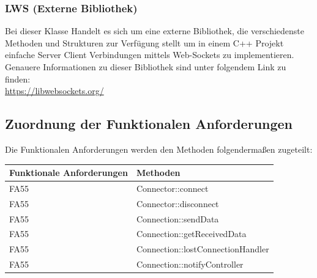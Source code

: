     \subsubsection{LWS (Externe Bibliothek)}
		Bei dieser Klasse Handelt es sich um eine externe Bibliothek, die verschiedenste Methoden und Strukturen zur Verfügung stellt um in einem C++ Projekt einfache Server Client Verbindungen mittels Web-Sockets zu implementieren. Genauere Informationen zu dieser Bibliothek sind unter folgendem Link zu finden: \\ \url{https://libwebsockets.org/}

\subsection{Zuordnung der Funktionalen Anforderungen}

Die Funktionalen Anforderungen werden den Methoden folgendermaßen zugeteilt:

\begin{table}[h]
	\centering
	\begin{tabular}{|l|l|}
    	\hline
    	\textbf{Funktionale Anforderungen} & \textbf{Methoden} \\ \hline
		FA55 & Connector::connect \\ \hline
    	FA55 & Connector::disconnect \\ \hline    	
    	FA55 & Connection::sendData \\ \hline
    	FA55 & Connection::getReceivedData \\ \hline
    	FA55 & Connection::lostConnectionHandler \\ \hline
    	FA55 & Connection::notifyController \\ \hline

	\end{tabular}
\end{table}